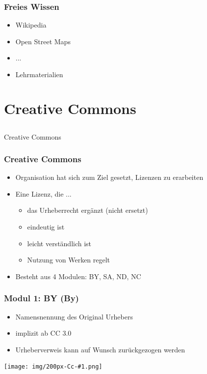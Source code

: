 \documentclass[table]{beamer}
\newcommand{\Cc}[1]{\begin{center}
    \texttt{[image: img/200px-Cc-\#1.png]}
\end{center}}
\begin{document}
\begin{frame}
    \frametitle{Freies Wissen}
    \begin{itemize}
      \item<2-> Wikipedia
      \item<3-> Open Street Maps
      \item<4-> ...
      \item<5-> Lehrmaterialien
    \end{itemize}
\end{frame}
 
\section{Creative Commons}
\subsection{}

\begin{frame}
    \begin{center}\Large
    Creative Commons
    \end {center}
\end{frame}

\begin{frame}
    \frametitle{Creative Commons}
    \begin{itemize}
        \item<2-> Organisation hat sich zum Ziel gesetzt, Lizenzen zu erarbeiten
        \item<3-> Eine Lizenz, die ...
            \begin{itemize}
                \item<4-> das Urheberrecht ergänzt (nicht ersetzt)
                \item<5-> eindeutig ist
                \item<6-> leicht verständlich ist
                \item<7-> Nutzung von Werken regelt
            \end{itemize}
        \item<8-> Besteht aus 4 Modulen: BY, SA, ND, NC
    \end{itemize}
\end{frame}

\begin{frame}
    \frametitle{Modul 1: BY (By)}
    \begin{itemize}
        \item Namensnennung des Original Urhebers
        \item implizit ab CC 3.0
        \item Urheberverweis kann auf Wunsch zurückgezogen werden
    \end{itemize}
        \Cc{by}
\end{frame}
\end{document}
